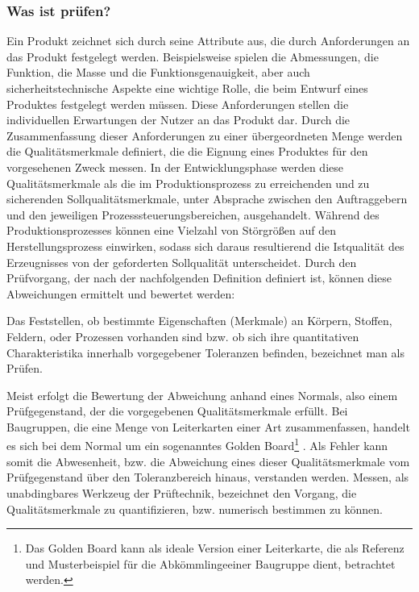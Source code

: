 \subsubsection{Was ist prüfen?}
    \label{subsubsection: Was ist pruefen}
    Ein Produkt zeichnet sich durch seine Attribute aus, die durch Anforderungen an das Produkt festgelegt werden.
    Beispielsweise spielen die Abmessungen, die Funktion, die Masse und die Funktionsgenauigkeit, aber auch sicherheitstechnische Aspekte eine wichtige Rolle, die beim Entwurf eines Produktes festgelegt werden müssen.
    Diese Anforderungen stellen die individuellen Erwartungen der Nutzer an das Produkt dar.
    Durch die Zusammenfassung dieser Anforderungen zu einer übergeordneten Menge werden die Qualitätsmerkmale definiert, die die Eignung eines Produktes für den vorgesehenen Zweck messen.
    In der Entwicklungsphase werden diese Qualitätsmerkmale als die im Produktionsprozess zu erreichenden und zu sicherenden Sollqualitätsmerkmale, unter Absprache zwischen den Auftraggebern und den jeweiligen Prozesssteuerungsbereichen, ausgehandelt.
    Während des Produktionsprozesses können eine Vielzahl von Störgrößen auf den Herstellungsprozess einwirken, sodass sich daraus resultierend die Istqualität des Erzeugnisses von der geforderten Sollqualität unterscheidet. \cite{karger_pruftechnik_1985}
    Durch den Prüfvorgang, der nach der nachfolgenden Definition definiert ist, können diese Abweichungen ermittelt und bewertet werden:
    
    \begin{center}
        \begin{minipage}{0.75\textwidth}
                Das Feststellen, ob bestimmte Eigenschaften (Merkmale) an Körpern, Stoffen, Feldern, oder Prozessen vorhanden sind bzw. ob sich ihre quantitativen Charakteristika innerhalb vorgegebener Toleranzen befinden, bezeichnet man als Prüfen. \cite{karger_pruftechnik_1985}
        \end{minipage}
    \end{center}

    Meist erfolgt die Bewertung der Abweichung anhand eines Normals, also einem Prüfgegenstand, der die vorgegebenen Qualitätsmerkmale erfüllt.
    Bei Baugruppen, die eine Menge von Leiterkarten einer Art zusammenfassen, handelt es sich bei dem Normal um ein sogenanntes Golden Board\footnote{Das Golden Board kann als ideale Version einer Leiterkarte, die als Referenz und Musterbeispiel für die \glqq Abkömmlinge\grqq\@ einer Baugruppe dient, betrachtet werden.} \cite{berger_test-_2012}.
    Als Fehler kann somit die Abwesenheit, bzw. die Abweichung eines dieser Qualitätsmerkmale vom Prüfgegenstand über den Toleranzbereich hinaus, verstanden werden.
    Messen, als unabdingbares Werkzeug der Prüftechnik, bezeichnet den Vorgang, die Qualitätsmerkmale zu quantifizieren, bzw. numerisch bestimmen zu können. \cite{karger_pruftechnik_1985}

